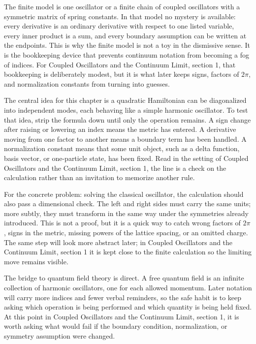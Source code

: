 The finite model is one oscillator or a finite chain of coupled oscillators with a symmetric matrix of spring constants.  In that model no mystery is available: every derivative is an ordinary derivative with respect to one listed variable, every inner product is a sum, and every boundary assumption can be written at the endpoints.  This is why the finite model is not a toy in the dismissive sense.  It is the bookkeeping device that prevents continuum notation from becoming a fog of indices.  For Coupled Oscillators and the Continuum Limit, section 1, that bookkeeping is deliberately modest, but it is what later keeps signs, factors of \(2\pi\), and normalization constants from turning into guesses.

The central idea for this chapter is a quadratic Hamiltonian can be diagonalized into independent modes, each behaving like a simple harmonic oscillator.  To test that idea, strip the formula down until only the operation remains.  A sign change after raising or lowering an index means the metric has entered.  A derivative moving from one factor to another means a boundary term has been handled.  A normalization constant means that some unit object, such as a delta function, basis vector, or one-particle state, has been fixed.  Read in the setting of Coupled Oscillators and the Continuum Limit, section 1, the line is a check on the calculation rather than an invitation to memorize another rule.

For the concrete problem: solving the classical oscillator, the calculation should also pass a dimensional check.  The left and right sides must carry the same units; more subtly, they must transform in the same way under the symmetries already introduced.  This is not a proof, but it is a quick way to catch wrong factors of \(2\pi\), signs in the metric, missing powers of the lattice spacing, or an omitted charge.  The same step will look more abstract later; in Coupled Oscillators and the Continuum Limit, section 1 it is kept close to the finite calculation so the limiting move remains visible.

The bridge to quantum field theory is direct.  A free quantum field is an infinite collection of harmonic oscillators, one for each allowed momentum.  Later notation will carry more indices and fewer verbal reminders, so the safe habit is to keep asking which operation is being performed and which quantity is being held fixed.  At this point in Coupled Oscillators and the Continuum Limit, section 1, it is worth asking what would fail if the boundary condition, normalization, or symmetry assumption were changed.

